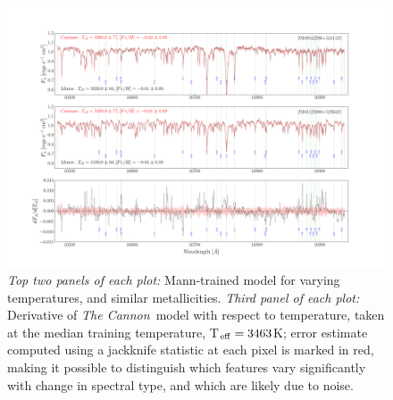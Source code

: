 \documentclass[twocolumn]{aastex62}
\newcommand{\thecannon}{\textsl{The Cannon}}
\begin{document}
\begin{figure}[]
	\begin{center}
	\includegraphics[width=16cm]{figures/demo_derivatives_teff3.png}
	\end{center}
	\caption{\textit{Top two panels of each plot:} Mann-trained model for varying temperatures, and similar metallicities. \textit{Third panel of each plot:} Derivative of \thecannon\ model with respect to temperature, taken at the median training temperature, T$_{\rm eff}=3463$K; error estimate computed using a jackknife statistic at each pixel is marked in red, making it possible to distinguish which features vary significantly with change in spectral type, and which are likely due to noise.}
	\label{fig:demo_teff}
\end{figure}
\end{document}
